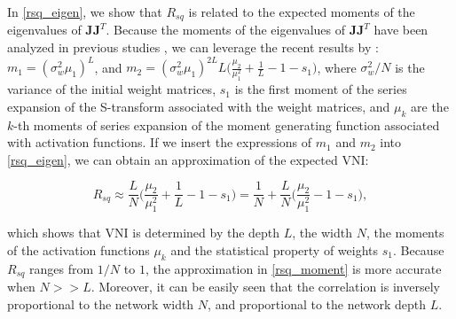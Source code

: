 In \eqref{rsq_eigen}, we show that  $R_{sq}$ is related to the expected moments of the eigenvalues of $\mathbf{JJ}^T$. Because the moments of the eigenvalues of $\mathbf{JJ}^T$ have been analyzed in previous studies \cite{mft:spectral}, we can leverage the recent results  by \cite{mft:spectral}: $m_1=(\sigma_w^2\mu_1)^L$, and $m_2=(\sigma_w^2\mu_1)^{2L}L\big(\frac{\mu_2}{\mu_1^2}+\frac{1}{L}-1-s_1\big)$,
where $\sigma_w^2/N$ is the variance of the initial weight matrices, $s_1$ is the first moment of the series expansion of the S-transform associated with the weight matrices, and $\mu_k$ are the $k$-th moments of series expansion of the moment generating function associated with activation functions.
If we insert the expressions of $m_1$ and $m_2$ into \eqref{rsq_eigen}, we can obtain an approximation of the expected VNI:

\begin{equation}
    R_{sq}\approx \frac{L}{N}\Big(\frac{\mu_2}{\mu_1^2}+\frac{1}{L}-1-s_1\Big)
    =
    \frac{1}{N}+\frac{L}{N}\Big(\frac{\mu_2}{\mu_1^2}-1-s_1\Big)
    ,
    \label{rsq_moment}
\end{equation}

which shows that VNI is determined by the depth $L$, the width $N$, the moments of the activation functions $\mu_k$ and the statistical property of weights $s_1$. 
Because $R_{sq}$ ranges from $1/N$ to $1$, the approximation in \eqref{rsq_moment} is more accurate when $N>>L$.
Moreover, it can be easily seen that the correlation is inversely proportional to the network width $N$, and proportional to the network depth $L$.

